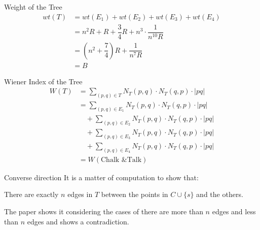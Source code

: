 \documentclass[11pt]{beamer}
\begin{document}
\begin{frame}{Weight of the Tree}
	\begin{align*}
		wt(T) & = wt(E_1) + wt(E_2) + wt(E_3) + wt(E_4)                  \\
		      & = n^2R + R + \dfrac{3}{4}R + n^3\cdot \dfrac{1}{n^{10}R} \\
		      & = \left(n^2 + \dfrac{7}{4}\right)R + \dfrac{1}{n^7R}     \\
		      & = B
	\end{align*}
\end{frame}

\begin{frame}{Wiener Index of the Tree}
	\begin{align*}
		W(T) & = \displaystyle\sum_{(p, q) \in T} N_T(p, q) \cdot N_T(q, p) \cdot |pq|        \\
		     & = \displaystyle\sum_{(p, q) \in E_1} N_T(p, q) \cdot N_T(q, p) \cdot |pq|      \\
		     & \quad+ \displaystyle\sum_{(p, q) \in E_2} N_T(p, q) \cdot N_T(q, p) \cdot |pq| \\
		     & \quad+ \displaystyle\sum_{(p, q) \in E_3} N_T(p, q) \cdot N_T(q, p) \cdot |pq| \\
		     & \quad+ \displaystyle\sum_{(p, q) \in E_4} N_T(p, q) \cdot N_T(q, p) \cdot |pq| \\
		     & = W (\text{Chalk \& Talk})
	\end{align*}
\end{frame}

\begin{frame}{Converse direction}
	It is a matter of computation to show that:
	\begin{theorem}[Claim 4]
		There are exactly $n$ edges in $T$ between the points in $C \cup \{s\}$ and the others.
	\end{theorem}

	The paper shows it considering the cases of there are more than $n$ edges and less than $n$ edges and shows a contradiction.
\end{frame}
\end{document}
